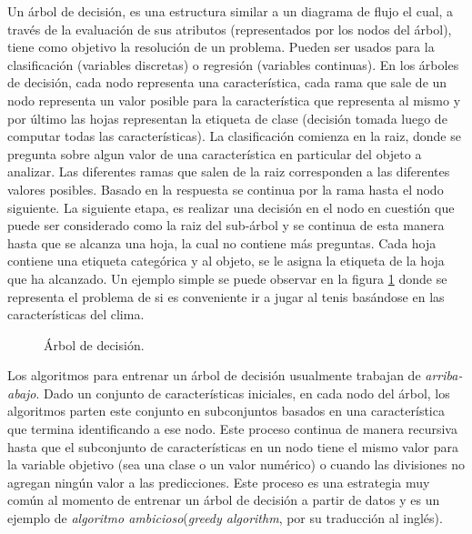 	Un árbol de decisión, es una estructura similar a un diagrama de flujo el cual, a través de la evaluación de sus atributos (representados por los nodos del árbol), tiene como objetivo la resolución de un problema. Pueden ser usados para la clasificación (variables discretas) o regresión (variables continuas). En los árboles de decisión, cada nodo representa una característica, cada rama que sale de un nodo representa un valor posible para la característica que representa al mismo y por último las hojas representan la etiqueta de clase (decisión tomada luego de computar todas las características). La clasificación comienza en la raiz, donde se pregunta sobre algun valor de una característica en particular del objeto a analizar. Las diferentes ramas que salen de la  raiz corresponden a las diferentes valores posibles. Basado en la respuesta se continua por la rama hasta el nodo siguiente. La siguiente etapa, es realizar una decisión en el nodo en cuestión que puede ser considerado como la raiz del sub-árbol y se continua de esta manera hasta que se alcanza una hoja, la cual no contiene más preguntas. Cada hoja contiene una etiqueta categórica y al objeto, se le asigna la etiqueta de la hoja que ha alcanzado. Un ejemplo simple se puede observar en la figura \ref{fig: Arbol de decision} donde se representa el problema de si es conveniente ir a jugar al tenis basándose en las características del clima.
		\begin{figure}[htbp]
			\centering
			\caption{Árbol de decisión.}
			\label{fig: Arbol de decision}
		\end{figure}
		
	Los algoritmos para entrenar un árbol de decisión usualmente trabajan de \textit{arriba-abajo}. Dado un conjunto de características iniciales, en cada nodo del árbol, los algoritmos parten este conjunto en subconjuntos basados en una característica que termina identificando a ese nodo. Este proceso continua de manera recursiva hasta que el subconjunto de características en un nodo tiene el mismo valor para la variable objetivo (sea una clase o un valor numérico) o cuando las divisiones no agregan ningún valor a las predicciones. Este proceso es una estrategia muy común al momento de entrenar un árbol de decisión a partir de datos y es un ejemplo de \textit{algoritmo ambicioso}(\textit{greedy algorithm}, por su traducción al inglés).
	
